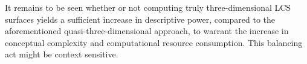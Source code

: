 It remains to be seen whether or not computing truly three-dimensional LCS
surfaces yields a sufficient increase in descriptive power, compared to the
aforementioned quasi-three-dimensional approach, to warrant the increase in
conceptual complexity and computational resource consumption. This balancing
act might be context sensitive.
